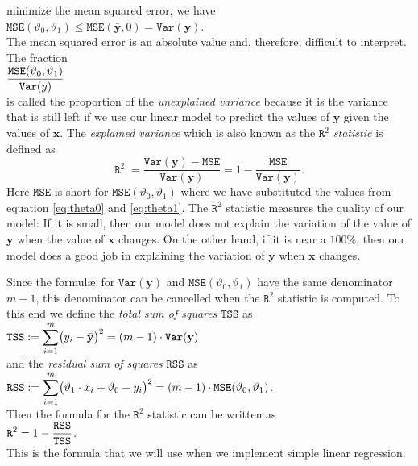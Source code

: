 minimize the mean squared error, we have
\\[0.2cm]
\hspace*{1.3cm}
$\mathtt{MSE}(\vartheta_0, \vartheta_1) \leq \mathtt{MSE}(\bar{\mathbf{y}}, 0) = \mathtt{Var}(\mathbf{y})$.
\\[0.2cm]
The mean squared error is an absolute value and, therefore, difficult to interpret.  The fraction
\\[0.2cm]
\hspace*{1.3cm}
$\displaystyle \frac{\mathtt{MSE}(\vartheta_0, \vartheta_1)}{\mathtt{Var}(y)}$
\\[0.2cm]
is called the proportion of the \emph{\color{blue}unexplained variance} because it is the variance that is still
left if we use our linear model to predict the values of $\mathbf{y}$ given the values of $\mathbf{x}$.  The
\emph{\color{blue}explained variance} which is also known as the \emph{\color{blue}$\mathtt{R}^2$ statistic} is defined as 
\begin{equation}
  \label{eq:Rsquare}
  \mathtt{R}^2 := \frac{\mathtt{Var}(\mathbf{y}) - \mathtt{MSE}}{\mathtt{Var}(\mathbf{y})} = 1 - \frac{\mathtt{MSE}}{\mathtt{Var}(\mathbf{y})}.
\end{equation}
Here $\mathtt{MSE}$ is short for $\mathtt{MSE}(\vartheta_0, \vartheta_1)$ where we have substituted the values
from equation \ref{eq:theta0} and \ref{eq:theta1}.  The $\mathtt{R}^2$ statistic measures the quality of our
model: If it is small, then our model does not explain the variation of the value of $\mathbf{y}$ when the value of $\mathbf{x}$
changes.  On the other hand, if it is near a $100\%$, then our model does a good job in explaining the 
variation of $\mathbf{y}$ when $\mathbf{x}$ changes.

Since the formul\ae\ for $\mathtt{Var}(\mathbf{y})$ and $\mathtt{MSE}(\vartheta_0, \vartheta_1)$ have the same
denominator $m-1$, this denominator can be cancelled when the $\mathtt{R}^2$ statistic is computed.  To this
end we define the \emph{\color{blue}total sum of squares} $\mathtt{TSS}$ as
\\[0.2cm]
\hspace*{1.3cm}
$\displaystyle\mathtt{TSS} := \sum\limits_{i=1}^m \bigl(y_i - \bar{\mathbf{y}}\bigr)^2 = (m-1) \cdot \mathtt{Var}(\mathbf{y})$
\\[0.2cm]
and the \emph{\color{blue}residual sum of squares} $\mathtt{RSS}$ as
\\[0.2cm]
\hspace*{1.3cm}
$\displaystyle\mathtt{RSS} := \sum\limits_{i=1}^m \bigl(\vartheta_1 \cdot x_i + \vartheta_0 - y_i\bigr)^2
                  = (m-1) \cdot \mathtt{MSE}(\vartheta_0, \vartheta_1)
$.
\\[0.2cm]
Then the formula for the $\mathtt{R}^2$ statistic can be written as
\\[0.2cm]
\hspace*{1.3cm}
$\displaystyle \mathtt{R}^2 = 1 - \frac{\mathtt{RSS}}{\mathtt{TSS}}$.
\\[0.2cm]
This is the formula that we will use when we implement simple linear regression.

